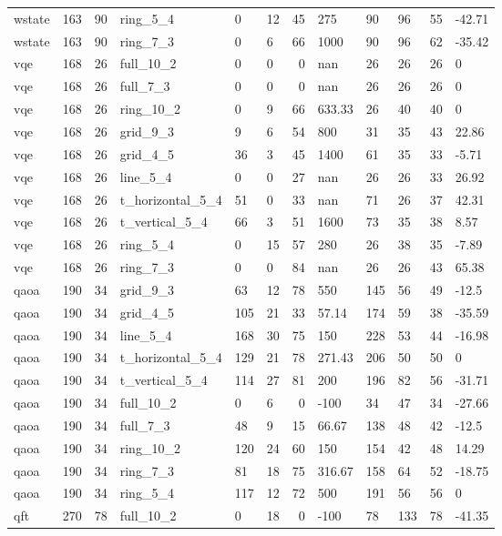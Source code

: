 \begin{longtable}{lrrlllrlllrl}
wstate & 163 & 90 & ring\_5\_4 & 0 & 12 & 45 & 275 & 90 & 96 & 55 & -42.71 \\
wstate & 163 & 90 & ring\_7\_3 & 0 & 6 & 66 & 1000 & 90 & 96 & 62 & -35.42 \\
vqe & 168 & 26 & full\_10\_2 & 0 & 0 & 0 & nan & 26 & 26 & 26 & 0 \\
vqe & 168 & 26 & full\_7\_3 & 0 & 0 & 0 & nan & 26 & 26 & 26 & 0 \\
vqe & 168 & 26 & ring\_10\_2 & 0 & 9 & 66 & 633.33 & 26 & 40 & 40 & 0 \\
vqe & 168 & 26 & grid\_9\_3 & 9 & 6 & 54 & 800 & 31 & 35 & 43 & 22.86 \\
vqe & 168 & 26 & grid\_4\_5 & 36 & 3 & 45 & 1400 & 61 & 35 & 33 & -5.71 \\
vqe & 168 & 26 & line\_5\_4 & 0 & 0 & 27 & nan & 26 & 26 & 33 & 26.92 \\
vqe & 168 & 26 & t\_horizontal\_5\_4 & 51 & 0 & 33 & nan & 71 & 26 & 37 & 42.31 \\
vqe & 168 & 26 & t\_vertical\_5\_4 & 66 & 3 & 51 & 1600 & 73 & 35 & 38 & 8.57 \\
vqe & 168 & 26 & ring\_5\_4 & 0 & 15 & 57 & 280 & 26 & 38 & 35 & -7.89 \\
vqe & 168 & 26 & ring\_7\_3 & 0 & 0 & 84 & nan & 26 & 26 & 43 & 65.38 \\
qaoa & 190 & 34 & grid\_9\_3 & 63 & 12 & 78 & 550 & 145 & 56 & 49 & -12.5 \\
qaoa & 190 & 34 & grid\_4\_5 & 105 & 21 & 33 & 57.14 & 174 & 59 & 38 & -35.59 \\
qaoa & 190 & 34 & line\_5\_4 & 168 & 30 & 75 & 150 & 228 & 53 & 44 & -16.98 \\
qaoa & 190 & 34 & t\_horizontal\_5\_4 & 129 & 21 & 78 & 271.43 & 206 & 50 & 50 & 0 \\
qaoa & 190 & 34 & t\_vertical\_5\_4 & 114 & 27 & 81 & 200 & 196 & 82 & 56 & -31.71 \\
qaoa & 190 & 34 & full\_10\_2 & 0 & 6 & 0 & -100 & 34 & 47 & 34 & -27.66 \\
qaoa & 190 & 34 & full\_7\_3 & 48 & 9 & 15 & 66.67 & 138 & 48 & 42 & -12.5 \\
qaoa & 190 & 34 & ring\_10\_2 & 120 & 24 & 60 & 150 & 154 & 42 & 48 & 14.29 \\
qaoa & 190 & 34 & ring\_7\_3 & 81 & 18 & 75 & 316.67 & 158 & 64 & 52 & -18.75 \\
qaoa & 190 & 34 & ring\_5\_4 & 117 & 12 & 72 & 500 & 191 & 56 & 56 & 0 \\
qft & 270 & 78 & full\_10\_2 & 0 & 18 & 0 & -100 & 78 & 133 & 78 & -41.35 \\

\end{longtable}

